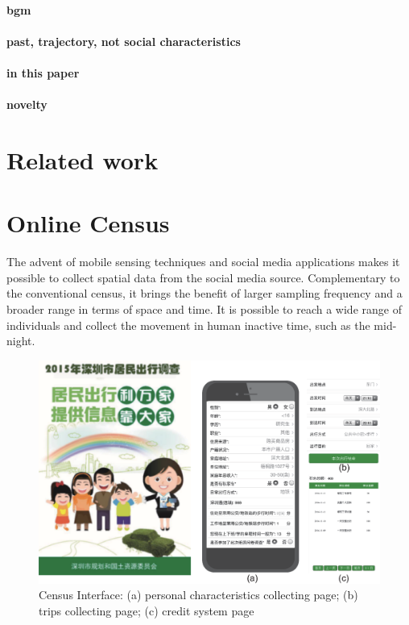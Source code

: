 \paragraph{bgm}

\paragraph{past, trajectory, not social characteristics}

\paragraph{in this paper}

\paragraph{novelty}



\section{Related work}



\section{Online Census}
The advent of mobile sensing techniques and social media applications makes it possible to collect spatial data from the social media source. Complementary to the conventional census, it brings the benefit of larger sampling frequency and a broader range in terms of space and time. It is possible to reach a wide range of individuals and collect the movement in human inactive time, such as the mid-night.

\begin{figure}[htb!]
 \centering %
 \includegraphics[width=\columnwidth]{pictures/survey_app}
 \caption{Census Interface: (a) personal characteristics collecting page; (b) trips collecting page; (c) credit system page}
 \label{fig:app}
\end{figure}

